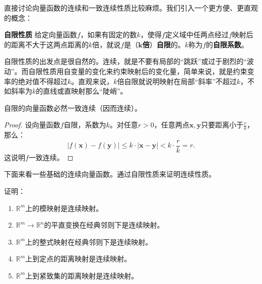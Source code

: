\documentclass[12pt,UTF8]{ctexbook}
\begin{document}
直接讨论向量函数的连续和一致连续性质比较麻烦。我们引入一个更方便、更直观的概念：
\begin{df}{\textbf{自限性质}}
    给定向量函数$f$，如果有固定的数$k$，使得$f$定义域中任两点经过$f$映射后的距离不大于这两点距离的$k$倍，就说$f$是（$\boldsymbol{k}$\textbf{倍}）\textbf{自限}的。$k$称为$f$的\textbf{自限系数}。
\end{df}

自限性质的出发点是很自然的。连续，就是不要有局部的“跳跃”或过于剧烈的“波动”。而自限性质用自变量的变化来约束映射后的变化量，简单来说，就是约束变率的绝对值不得超过$k$。直观来说，$k$倍自限就说明映射在局部“斜率”不超过$k$，不如斜率为$k$的直线或直映射那么“陡峭”。

\begin{tm}
    自限的向量函数必然一致连续（因而连续）。
\end{tm}

\begin{proof}
    设向量函数$f$自限，系数为$k$。对任意$r>0$，任意两点$\mathbf{x},\mathbf{y}$只要距离小于$\displaystyle\frac{r}{k}$，那么：
    $$ |f(\mathbf{x}) - f(\mathbf{y})| \leqslant k\cdot |\mathbf{x} - \mathbf{y}| < k \cdot \frac{r}{k} = r. $$
    这说明$f$一致连续。
\end{proof}

下面来看一些基础的连续向量函数。通过自限性质来证明连续性质。

\begin{et}
    证明：
    \begin{enumerate}[label=\arabic*.]
        \item $\mathbb{R}^m$上的模映射是连续映射。
        \item $\mathbb{R}^m \rightarrow \mathbb{R}^n$的平直变换在经典邻则下是连续映射。
        \item $\mathbb{R}^m$上的整式映射在经典邻则下是连续映射。
        \item $\mathbb{R}^m$上到定点的距离映射是连续映射。
        \item $\mathbb{R}^m$上到紧致集的距离映射是连续映射。
    \end{enumerate}
\end{et}
\end{document}
